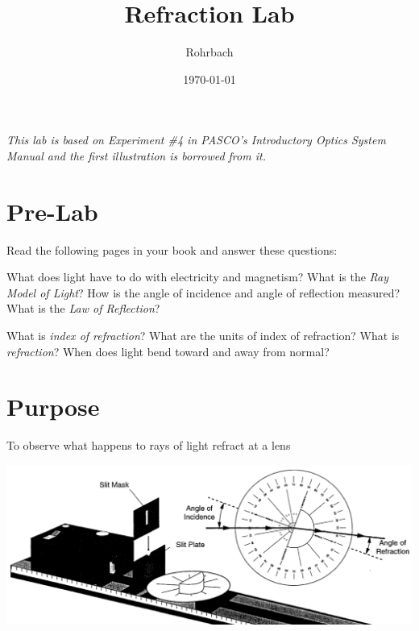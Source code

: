 \documentclass[10pt]{exam}
\title{Refraction Lab}
\author{Rohrbach}
\date{\today}
\begin{document}
\maketitle

\noindent
{\small \it This lab is based on Experiment \#4 in PASCO's Introductory Optics System Manual and the first illustration is borrowed from it.}


\section*{Pre-Lab}

Read the following pages in your book and answer these questions:

\begin{questions}

  \question What does light have to do with electricity and magnetism? \vs
  \question What is the \emph{Ray Model of Light}? \vs
  \question How is the angle of incidence and angle of reflection measured? \vs
  \question What is the \emph{Law of Reflection}? \vs  


  \question What is \emph{index of refraction}? \vs
  \question What are the units of index of refraction? \vs
  \question What is \emph{refraction}? \vs 
  \question When does light bend toward and away from normal? \vs 


\end{questions}

\pagebreak

\section*{Purpose} To observe what happens to rays of light refract at a lens

\includegraphics[width=15cm]{Fig4_1.png}
\end{document}
